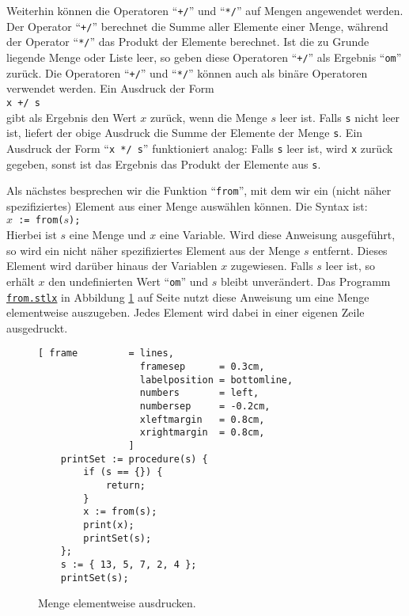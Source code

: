 Weiterhin können die Operatoren ``\texttt{+/}''
und ``\texttt{*/}'' auf Mengen angewendet werden.  Der Operator  ``\texttt{+/}'' berechnet
die Summe aller Elemente einer Menge, während der Operator ``\texttt{*/}'' das Produkt der
Elemente berechnet.  Ist die zu Grunde liegende Menge oder Liste leer, so geben diese
Operatoren ``\texttt{+/}'' als Ergebnis ``\texttt{om}'' zurück.
Die Operatoren ``\texttt{+/}'' und ``\texttt{*/}'' können auch als binäre Operatoren
verwendet werden.  Ein Ausdruck der Form
\\[0.2cm]
\hspace*{1.3cm}
\texttt{x +/ s}
\\[0.2cm]
gibt als Ergebnis den Wert $x$ zurück, wenn die Menge $s$ leer ist.  Falls \texttt{s}
nicht leer ist, liefert der obige Ausdruck die Summe der Elemente der Menge \texttt{s}.
Ein Ausdruck der Form ``\texttt{x */ s}'' funktioniert analog:  Falls \texttt{s} leer ist,
wird \texttt{x} zurück gegeben, sonst ist das Ergebnis das Produkt der Elemente aus \texttt{s}.

Als nächstes besprechen wir die Funktion
``\texttt{from}'', mit dem wir ein (nicht näher spezifiziertes) Element aus einer
Menge auswählen können.  Die Syntax ist: 
\\[0.2cm]
\hspace*{1.3cm} 
\texttt{$x$ \texttt{:= from(}$s$\texttt{)};}
\\[0.2cm]
Hierbei ist $s$ eine Menge und $x$  eine Variable.  Wird diese Anweisung
ausgeführt, so wird ein nicht näher spezifiziertes Element aus der Menge $s$
entfernt.  Dieses Element wird darüber hinaus der Variablen $x$ zugewiesen.
Falls $s$ leer ist, so erhält $x$ den undefinierten Wert ``\texttt{om}'' und
$s$ bleibt unverändert.  Das Programm 
\href{https://github.com/karlstroetmann/Logik/blob/master/SetlX/from.stlx}{\texttt{from.stlx}}
in Abbildung \ref{fig:from.stlx} auf Seite
\pageref{fig:from.stlx} nutzt diese Anweisung um eine Menge elementweise
auszugeben.  Jedes Element wird dabei in einer eigenen Zeile ausgedruckt.

\begin{figure}[!ht]
  \centering
\begin{Verbatim}[ frame         = lines, 
                  framesep      = 0.3cm, 
                  labelposition = bottomline,
                  numbers       = left,
                  numbersep     = -0.2cm,
                  xleftmargin   = 0.8cm,
                  xrightmargin  = 0.8cm,
                ]
    printSet := procedure(s) {
        if (s == {}) {
            return;
        }
        x := from(s);
        print(x);
        printSet(s);
    };
    s := { 13, 5, 7, 2, 4 };
    printSet(s);
\end{Verbatim} 
\vspace*{-0.3cm}
\caption{Menge elementweise ausdrucken.}  \label{fig:from.stlx}
\end{figure} 

